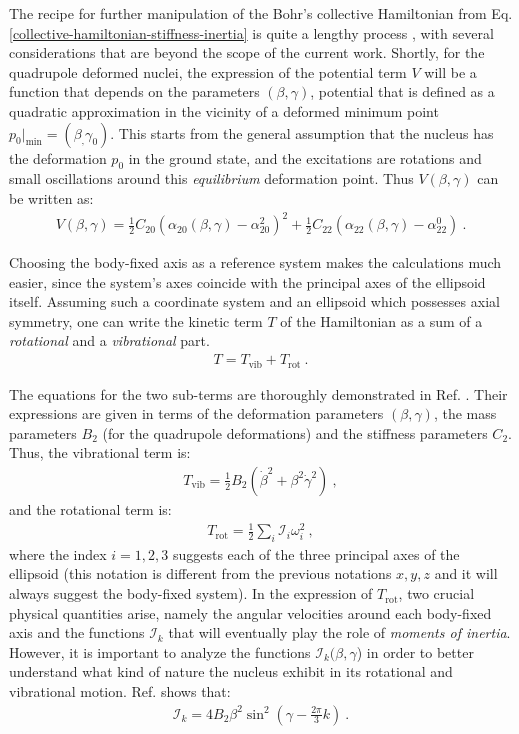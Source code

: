 The recipe for further manipulation of the Bohr's collective Hamiltonian from Eq. \ref{collective-hamiltonian-stiffness-inertia} is quite a lengthy process \cite{bohr1998nuclear,ring2004nuclear}, with several considerations that are beyond the scope of the current work. Shortly, for the quadrupole deformed nuclei, the expression of the potential term $V$ will be a function that depends on the parameters $(\beta,\gamma)$, potential that is defined as a quadratic approximation in the vicinity of a deformed minimum point $p_0|_\text{min}=(\beta_,\gamma_0)$. This starts from the general assumption that the nucleus has the deformation $p_0$ in the ground state, and the excitations are rotations and small oscillations around this \emph{equilibrium} deformation point. Thus $V(\beta,\gamma)$ can be written as:
\begin{align}
    V(\beta,\gamma)=\frac{1}{2}C_{20}\left(\alpha_{20}(\beta,\gamma)-\alpha_{20}^2\right)^2+\frac{1}{2}C_{22}\left(\alpha_{22}(\beta,\gamma)-\alpha_{22}^0\right)\ .
    \label{bohr-collective-potential}
\end{align}

Choosing the body-fixed axis as a reference system makes the calculations much easier, since the system's axes coincide with the principal axes of the ellipsoid itself. Assuming such a coordinate system and an ellipsoid which possesses axial symmetry, one can write the kinetic term $T$ of the Hamiltonian as a sum of a \emph{rotational} and a \emph{vibrational} part.
\begin{align}
    T=T_\text{vib}+T_\text{rot}\ .
\end{align}

The equations for the two sub-terms are thoroughly demonstrated in Ref. \cite{li2022model}. Their expressions are given in terms of the deformation parameters $(\beta,\gamma)$, the mass parameters $B_2$ (for the quadrupole deformations) and the stiffness parameters $C_2$. Thus, the vibrational term is:
\begin{align}
    T_\text{vib}=\frac{1}{2}B_2\left(\dot{\beta}^2+\beta^2\dot{\gamma}^2\right)\ ,
    \label{kinetic-vibrational-energy-collective}
\end{align}
and the rotational term is:
\begin{align}
    T_\text{rot}=\frac{1}{2}\sum_i\mathcal{I}_i\omega_i^2\ ,
    \label{kinetic-rotational-energy-collective}
\end{align}
where the index $i=1,2,3$ suggests each of the three principal axes of the ellipsoid (this notation is different from the previous notations $x,y,z$ and it will always suggest the body-fixed system). In the expression of $T_\text{rot}$, two crucial physical quantities arise, namely the angular velocities around each body-fixed axis and the functions $\mathcal{I}_k$ that will eventually play the role of \emph{moments of inertia}. However, it is important to analyze the functions $\mathcal{I}_k(\beta,\gamma$) in order to better understand what kind of nature the nucleus exhibit in its rotational and vibrational motion. Ref. \cite{ring2004nuclear} shows that:
\begin{align}
    \mathcal{I}_k=4B_2\beta^2\sin^2\left(\gamma-\frac{2\pi}{3}k\right)\ .
\end{align}

